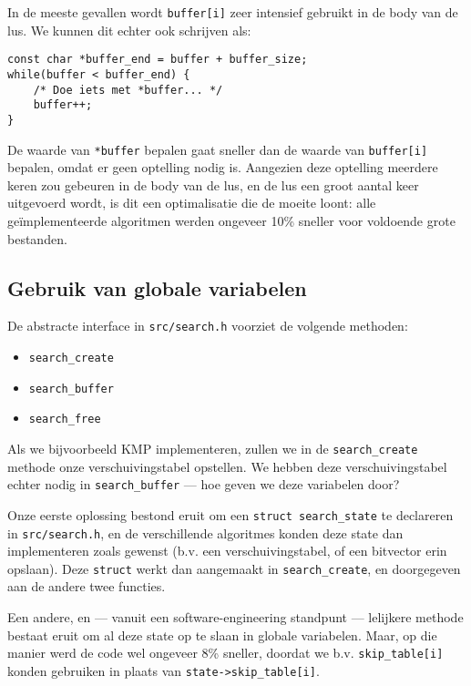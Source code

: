 \documentclass[a4paper,11pt]{article}
\begin{document}
In de meeste gevallen wordt \verb#buffer[i]# zeer intensief gebruikt in de body
van de lus. We kunnen dit echter ook schrijven als:

\begin{verbatim}
const char *buffer_end = buffer + buffer_size;
while(buffer < buffer_end) {
    /* Doe iets met *buffer... */
    buffer++;
}
\end{verbatim}

De waarde van \verb#*buffer# bepalen gaat sneller dan de waarde van
\verb#buffer[i]# bepalen, omdat er geen optelling nodig is. Aangezien deze
optelling meerdere keren zou gebeuren in de body van de lus, en de lus een groot
aantal keer uitgevoerd wordt, is dit een optimalisatie die de moeite loont: alle
ge\"implementeerde algoritmen werden ongeveer 10\% sneller voor voldoende grote
bestanden.

\subsection{Gebruik van globale variabelen}

De abstracte interface in \verb#src/search.h# voorziet de volgende methoden:

\begin{itemize}
    \item \verb#search_create#
    \item \verb#search_buffer#
    \item \verb#search_free#
\end{itemize}

Als we bijvoorbeeld KMP implementeren, zullen we in de \verb#search_create#
methode onze verschuivingstabel opstellen. We hebben deze verschuivingstabel
echter nodig in \verb#search_buffer# — hoe geven we deze variabelen door?

Onze eerste oplossing bestond eruit om een \verb#struct search_state# te
declareren in \verb#src/search.h#, en de verschillende algoritmes konden
deze state dan implementeren zoals gewenst (b.v. een verschuivingstabel,
of een bitvector erin opslaan). Deze \verb#struct# werkt dan aangemaakt in
\verb#search_create#, en doorgegeven aan de andere twee functies.

Een andere, en — vanuit een software-engineering standpunt — lelijkere methode
bestaat eruit om al deze state op te slaan in globale variabelen. Maar, op die
manier werd de code wel ongeveer 8\% sneller, doordat we b.v.
\verb#skip_table[i]# konden gebruiken in plaats van \verb#state->skip_table[i]#.
\end{document}
